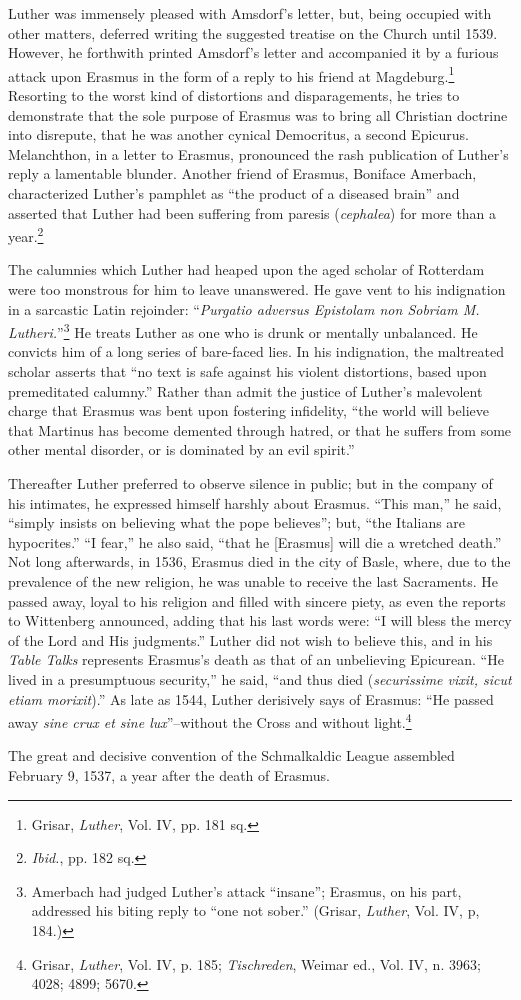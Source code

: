 Luther was immensely pleased with Amsdorf’s letter, but, being occupied with
other matters, deferred writing the suggested treatise on the Church until
1539. However, he forthwith printed Amsdorf’s letter and accompanied it by a
furious attack upon Erasmus in the form of a reply to his friend at
Magdeburg.\footnote{Grisar, \textit{Luther}, Vol. IV, pp. 181 sq.} Resorting to
the worst kind of distortions and disparagements, he tries to demonstrate that
the sole purpose of Erasmus was to bring all Christian doctrine into disrepute,
that he was another cynical Democritus, a second Epicurus. Melanchthon, in a
letter to Erasmus, pronounced the rash publication of Luther’s reply a
lamentable blunder. Another friend of Erasmus, Boniface Amerbach, characterized
Luther’s pamphlet as “the product of a diseased brain” and asserted that Luther
had been suffering from paresis (\textit{cephalea}) for more than a
year.\footnote{\textit{Ibid.}, pp. 182 sq.}

The calumnies which Luther had heaped upon the aged scholar of
Rotterdam were too monstrous for him to leave unanswered. He gave
vent to his indignation in a sarcastic Latin rejoinder: “\textit{Purgatio adversus
Epistolam non Sobriam M. Lutheri.}”\footnote
{Amerbach had judged Luther’s attack “insane”; Erasmus, on his part, addressed his
biting reply to “one not sober.” (Grisar, \textit{Luther}, Vol. IV, p, 184.)}
He treats Luther as one
who is drunk or mentally unbalanced. He convicts him of a long
series of bare-faced lies. In his indignation, the maltreated scholar
asserts that “no text is safe against his violent distortions, based upon
premeditated calumny.” Rather than admit the justice of Luther’s
malevolent charge that Erasmus was bent upon fostering infidelity,
“the world will believe that Martinus has become demented through
hatred, or that he suffers from some other mental disorder, or is dominated
by an evil spirit.”

Thereafter Luther preferred to observe silence in public; but in the company
of his intimates, he expressed himself harshly about Erasmus. “This
man,” he said, “simply insists on believing what the pope believes”; but,
“the Italians are hypocrites.” “I fear,” he also said, “that he [Erasmus] will
die a wretched death.” Not long afterwards, in 1536, Erasmus died in the
city of Basle, where, due to the prevalence of the new religion, he was unable
to receive the last Sacraments. He passed away, loyal to his religion and
filled with sincere piety, as even the reports to Wittenberg announced, adding
that his last words were: “I will bless the mercy of the Lord and His
judgments.” Luther did not wish to believe this, and in his \textit{Table Talks}
represents Erasmus’s death as that of an unbelieving Epicurean. “He lived
in a presumptuous security,” he said, “and thus died (\textit{securissime vixit,
sicut etiam morixit}).” As late as 1544, Luther derisively says of Erasmus:
“He passed away \textit{sine crux et sine lux}”--without the Cross and without
light.\footnote
{Grisar, \textit{Luther}, Vol. IV, p. 185; \textit{Tischreden}, Weimar ed., Vol. IV, n. 3963; 4028; 4899;
5670.}

The great and decisive convention of the Schmalkaldic League assembled
February 9, 1537, a year after the death of Erasmus.
